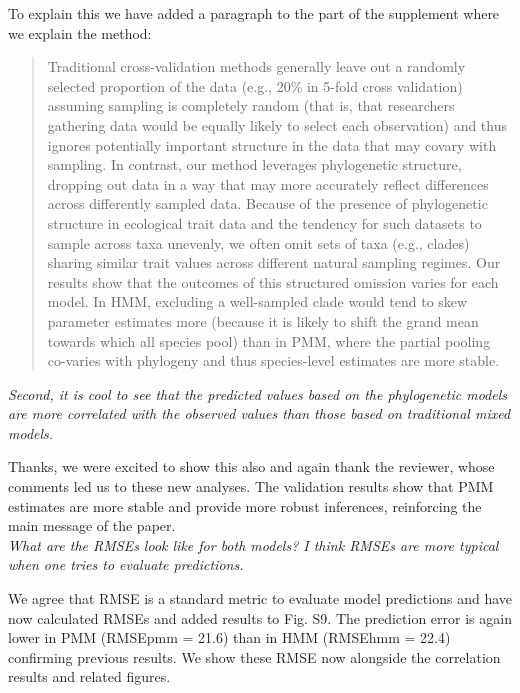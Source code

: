 \documentclass[11pt]{article}
\begin{document}
To explain this we have added a paragraph to the part of the supplement where we explain the method:

\begin{quote}
Traditional cross-validation methods generally leave out a randomly selected proportion of the data (e.g., 20\% in 5-fold cross validation) assuming sampling is completely random (that is, that researchers gathering data would be equally likely to select each observation) and thus ignores potentially important structure in the data that may covary with sampling. In contrast, our method leverages phylogenetic structure, dropping out data in a way that may more accurately reflect differences across differently sampled data. Because of the presence of phylogenetic structure in ecological trait data and the tendency for such datasets to sample across taxa unevenly, we often omit sets of taxa (e.g., clades) sharing similar trait values across different natural sampling regimes. Our results show that the outcomes of this structured omission varies for each model. In HMM, excluding a well-sampled clade would tend to skew parameter estimates more (because it is likely to shift the grand mean towards which all species pool) than in PMM, where the partial pooling co-varies with phylogeny and thus species-level estimates are more stable. 
\end{quote} 


\emph{Second, it is cool to see that the predicted values based on the phylogenetic models are more correlated with the observed values than those based on traditional mixed models. }

Thanks, we were excited to show this also and again thank the reviewer, whose comments led us to these new analyses. The validation results show that PMM estimates are more stable and provide more robust inferences, reinforcing the main message of the paper.\\


\emph{What are the RMSEs look like for both models? I think RMSEs are more typical when one tries to evaluate predictions. }

We agree that RMSE is a standard metric to evaluate model predictions and have now calculated RMSEs and added results to Fig. S9. The prediction error is again lower in PMM (RMSEpmm = 21.6) than in HMM (RMSEhmm = 22.4) confirming previous results. We show these RMSE now alongside the correlation results and related figures. \\
\end{document}
